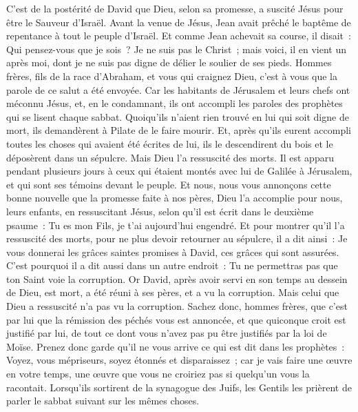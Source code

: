 \begin{multicols}{2}
C'est de la postérité de David que Dieu, selon sa promesse, a suscité Jésus pour être le Sauveur d'Israël.
Avant la venue de Jésus, Jean avait prêché le baptême de repentance à tout le peuple d'Israël.
Et comme Jean achevait sa course, il disait~: Qui pensez-vous que je sois~? Je ne suis pas le Christ~; mais voici, il en vient un après moi, dont je ne suis pas digne de délier le soulier de ses pieds.
Hommes frères, fils de la race d'Abraham, et vous qui craignez Dieu, c'est à vous que la parole de ce salut a été envoyée.
Car les habitants de Jérusalem et leurs chefs ont méconnu Jésus, et, en le condamnant, ils ont accompli les paroles des prophètes qui se lisent chaque sabbat.
Quoiqu'ils n'aient rien trouvé en lui qui soit digne de mort, ils demandèrent à Pilate de le faire mourir.
Et, après qu'ils eurent accompli toutes les choses qui avaient été écrites de lui, ils le descendirent du bois et le déposèrent dans un sépulcre.
Mais Dieu l'a ressuscité des morts.
Il est apparu pendant plusieurs jours à ceux qui étaient montés avec lui de Galilée à Jérusalem, et qui sont ses témoins devant le peuple.
Et nous, nous vous annonçons cette bonne nouvelle que la promesse faite à nos pères,
Dieu l'a accomplie pour nous, leurs enfants, en ressuscitant Jésus, selon qu'il est écrit dans le deuxième psaume~: Tu es mon Fils, je t'ai aujourd'hui engendré.
Et pour montrer qu'il l'a ressuscité des morts, pour ne plus devoir retourner au sépulcre, il a dit ainsi~: Je vous donnerai les grâces saintes promises à David, ces grâces qui sont assurées.
C'est pourquoi il a dit aussi dans un autre endroit~: Tu ne permettras pas que ton Saint voie la corruption.
Or David, après avoir servi en son temps au dessein de Dieu, est mort, a été réuni à ses pères, et a vu la corruption.
Mais celui que Dieu a ressuscité n'a pas vu la corruption.
Sachez donc, hommes frères, que c'est par lui que la rémission des péchés vous est annoncée,
et que quiconque croit est justifié par lui, de tout ce dont vous n'avez pas pu être justifiés par la loi de Moïse.
Prenez donc garde qu'il ne vous arrive ce qui est dit dans les prophètes~:
Voyez, vous mépriseurs, soyez étonnés et disparaissez~; car je vais faire une œuvre en votre temps, une œuvre que vous ne croiriez pas si quelqu'un vous la racontait.
Lorsqu'ils sortirent de la synagogue des Juifs, les Gentils les prièrent de parler le sabbat suivant sur les mêmes choses.

\end{multicols}

